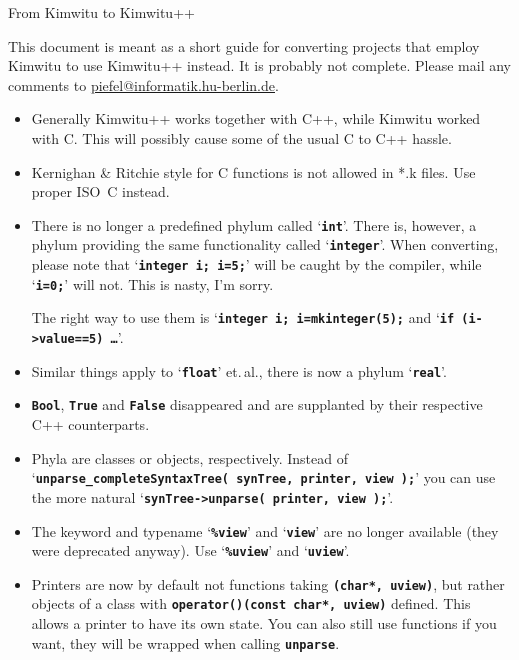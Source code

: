 \documentclass[a4paper,10pt]{article}
\newcommand{\programtext}[1]{\texttt{\textbf{#1}}}
\begin{document}
\begin{center}\Huge From Kimwitu to Kimwitu++\end{center}

This document is meant as a short guide for converting projects that employ
Kimwitu to use Kimwitu++ instead. It is probably not complete. Please mail
any comments to \url{piefel@informatik.hu-berlin.de}. %

\begin{itemize}
    \item Generally Kimwitu++ works together with C++, while Kimwitu worked with C.
    This will possibly cause some of the usual C to C++ hassle.

    \item Kernighan \& Ritchie style for C functions is not allowed in *.k files.
    Use proper ISO~C instead.

    \item There is no longer a predefined phylum called `\programtext{int}'. There
    is, however, a phylum providing the same functionality called
    `\programtext{integer}'. When converting, please note that `\programtext{integer
    i; i=5;}' will be caught by the compiler, while `\programtext{i=0;}' will not.
    This is nasty, I'm sorry.

    The right way to use them is `\programtext{integer i; i=mkinteger(5);} and
    `\programtext{if (i->value==5) \dots}'.

    \item Similar things apply to `\programtext{float}' et.\,al., there is now a
    phylum `\programtext{real}'.

    \item \programtext{Bool}, \programtext{True} and \programtext{False} disappeared and are
    supplanted by their respective C++ counterparts.

    \item Phyla are classes or objects, respectively. Instead of
    `\programtext{unparse\_completeSyntaxTree( synTree, printer, view );}' you can
    use the more natural `\programtext{synTree->unparse( printer, view );}'.

    \item The keyword and typename `\programtext{\%view}' and `\programtext{view}'
    are no longer available (they were deprecated anyway). Use
    `\programtext{\%uview}' and `\programtext{uview}'.

    \item Printers are now by default not functions taking \programtext{(char*,
    uview)}, but rather objects of a class with \programtext{operator()(const char*,
    uview)} defined. This allows a printer to have its own state. You can also still
    use functions if you want, they will be wrapped when calling
    \programtext{unparse}.


\end{itemize}
\end{document}

